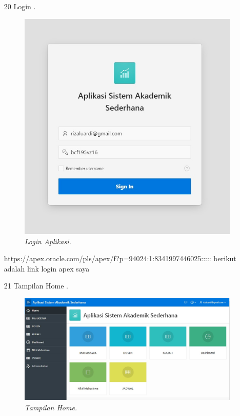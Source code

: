 \begin{enumerate}
\item[20]Login .
\begin{figure}[!htbp]
    \begin{center}
    \includegraphics[scale=0.5]{figures/run.jpg}
    \caption{\textit{Login Aplikasi.}}
    \end{center}
\end{figure}
\par https://apex.oracle.com/pls/apex/f?p=94024:1:8341997446025::::: berikut adalah link login apex saya

\item[21]Tampilan Home .
\begin{figure}[!htbp]
    \begin{center}
    \includegraphics[scale=0.3]{figures/10.jpg}
    \caption{\textit{Tampilan Home.}}
    \end{center}
\end{figure}
\par


\end{enumerate}
